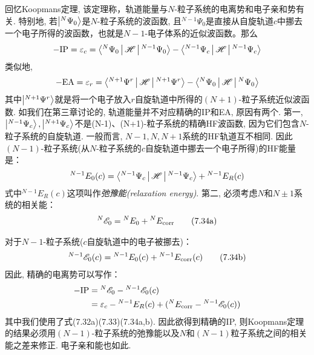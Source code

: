 回忆Koopmans定理, 该定理称，轨道能量与$N$-粒子系统的电离势和电子亲和势有关. 特别地, 若$\Ket{{}^N\Psi_0}$是$N$-粒子系统的\hft 波函数, 且${}^{N-1}\Psi_0$是直接从自旋轨道$c$中挪去一个电子所得的波函数，也就是$N-1$-电子体系的近似波函数。那么
\begin{align}
-\mathrm{IP} = \varepsilon_c = \Braket{{}^N\Psi_0|\mathscr{H}|{}^{N-1}\Psi_0} - \Braket{{}^{N-1}\Psi_c|\mathscr{H}|{}^{N-1}\Psi_c}
\end{align}
类似地,
\begin{align}
-\mathrm{EA} = \varepsilon_r = \Braket{^{N+1}\Psi^r|\mathscr{H}| ^{N+1}\Psi^r} - \Braket{^{N}\Psi_0|\mathscr{H}|^{N}\Psi_0}
\end{align}
其中$\Ket{^{N+1}\Psi^r}$就是将一个电子放入$r$自旋轨道中所得的$(N+1)$-粒子系统近似波函数. 如我们在第三章讨论的, 轨道能量并不对应精确的IP和EA, 原因有两个. 第一,$\Ket{^{N-1}\Psi_c},\Ket{^{N+1}\Psi_c}$不是(N-1)、(N+1)-粒子系统的精确HF波函数, 因为它们包含$N$-粒子系统的自旋轨道. 一般而言, $N-1,N,N+1$系统的HF轨道互不相同. 因此$(N-1)$-粒子系统(从$N$-粒子系统的$c$自旋轨道中挪去一个电子所得)的HF能量是：
\begin{align}
{}^{N-1}E_0(c) = \Braket{{}^{N-1}\Psi_c|\mathscr{H}|{}^{N-1}\Psi_c} + {}^{N-1}E_R(c)
\end{align}
式中${}^{N-1}E_R(c)$这项叫作\emph{弛豫能(relaxation energy)}. 第二, 必须考虑$N$和$N\pm1$系统的相关能：
\begin{align}
{}^N\mathscr{E}_0 = {}^NE_0 + {}^NE_\mathrm{corr}\tag{7.34a}
\end{align}
\addtocounter{equation}{-1}
对于$N-1$-粒子系统($c$自旋轨道中的电子被挪去)：
\begin{align}
{}^{N-1}\mathscr{E}_0(c) = {}^{N-1}E_0(c) + {}^{N-1}E_\mathrm{corr}(c)\tag{7.34b}
\end{align}
因此, 精确的电离势可以写作：
\begin{align}
-\mathrm{IP} & = {}^N\mathscr{E}_0 - {}^{N-1}\mathscr{E}_0(c)\notag\\
             & = \varepsilon_c - {}^{N-1}E_R(c) + ({}^NE_\mathrm{corr} - {}^{N-1}\mathscr{E}_0(c))
\end{align}
其中我们使用了式(7.32a)(7.33)(7.34a,b). 因此欲得到精确的IP, 则Koopmans定理的结果必须用$(N-1)$-粒子系统的弛豫能以及$N$和$(N-1)$粒子系统之间的相关能之差来修正. 电子亲和能也如此. 
